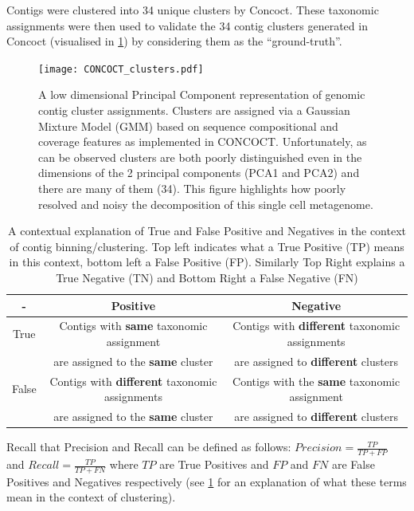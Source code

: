 Contigs were clustered into 34 unique clusters by Concoct.
These taxonomic assignments were then used to validate the 34 contig clusters 
generated in Concoct (visualised in \cref{fig:concoct_clusters}) by considering them
as the ``ground-truth''.

\begin{figure}
	\texttt{[image: CONCOCT\_clusters.pdf]}
    \caption[Genomic contig clustering]{A low dimensional Principal Component representation of genomic contig
		cluster assignments.  Clusters are assigned via a Gaussian Mixture Model (GMM) 
		based on sequence compositional and coverage features as implemented in CONCOCT.
		Unfortunately, as can be observed clusters are both poorly distinguished even
        in the dimensions of the 2 principal components (PCA1 and PCA2) and there are many of them (34).
    This figure highlights how poorly resolved and noisy the decomposition of this single cell
    metagenome.}
	\label{fig:concoct_clusters}
\end{figure}

\begin{table}
    \begin{tabular}{| c || c | c |}
    	\hline
		 - & Positive & Negative \\
		 \hline
		 \hline
		True  &  Contigs with \textbf{same} taxonomic assignment   & Contigs with \textbf{different} taxonomic assignments \\
		& are assigned to the \textbf{same} cluster & are assigned to \textbf{different} clusters \\
		\hline
		False &  Contigs with \textbf{different} taxonomic assignments  & Contigs with the \textbf{same} taxonomic assignment \\
		& are assigned to the \textbf{same} cluster & are assigned to \textbf{different} clusters  \\
		\hline
	\end{tabular}
    \caption[Explanation of Clustering Errors]{A contextual explanation of True and False Positive and Negatives in the context of contig binning/clustering.  Top left indicates what a
		True Positive (TP) means in this context, bottom left a False Positive (FP).  Similarly Top Right explains a True Negative (TN) and Bottom Right a
		False Negative (FN)}
	\label{tab:cluster_outcome_explanation}
\end{table}

Recall that Precision and Recall can be defined as follows:
\( Precision = \frac{TP}{TP+FP}\) and \(Recall = \frac{TP}{TP+FN} \)
where \(TP\) are True Positives and \(FP\) and \(FN\) are False Positives
and Negatives respectively (see \cref{tab:cluster_outcome_explanation} for an 
explanation of what these terms mean in the context of clustering).

